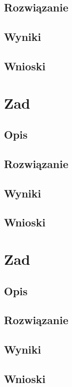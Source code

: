 \documentclass[10pt,a4paper]{article}
\begin{document}
\subsection*{Rozwiązanie}
\subsection*{Wyniki}
\subsection*{Wnioski}
\section{Zad}
\subsection*{Opis}
\subsection*{Rozwiązanie}
\subsection*{Wyniki}
\subsection*{Wnioski}
\section{Zad}
\subsection*{Opis}
\subsection*{Rozwiązanie}
\subsection*{Wyniki}
\subsection*{Wnioski}
\end{document}
